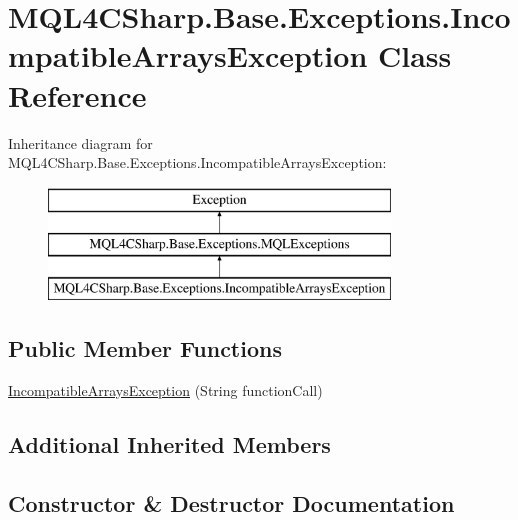 \hypertarget{class_m_q_l4_c_sharp_1_1_base_1_1_exceptions_1_1_incompatible_arrays_exception}{}\section{M\+Q\+L4\+C\+Sharp.\+Base.\+Exceptions.\+Incompatible\+Arrays\+Exception Class Reference}
\label{class_m_q_l4_c_sharp_1_1_base_1_1_exceptions_1_1_incompatible_arrays_exception}
Inheritance diagram for M\+Q\+L4\+C\+Sharp.\+Base.\+Exceptions.\+Incompatible\+Arrays\+Exception\+:\begin{figure}[H]
\begin{center}
\leavevmode
\includegraphics[height=3.000000cm]{class_m_q_l4_c_sharp_1_1_base_1_1_exceptions_1_1_incompatible_arrays_exception}
\end{center}
\end{figure}
\subsection*{Public Member Functions}
\begin{DoxyCompactItemize}
\item 
\hyperlink{class_m_q_l4_c_sharp_1_1_base_1_1_exceptions_1_1_incompatible_arrays_exception_a69d6514997903d8fe14e8fe3d553906f}{Incompatible\+Arrays\+Exception} (String function\+Call)
\end{DoxyCompactItemize}
\subsection*{Additional Inherited Members}


\subsection{Constructor \& Destructor Documentation}
